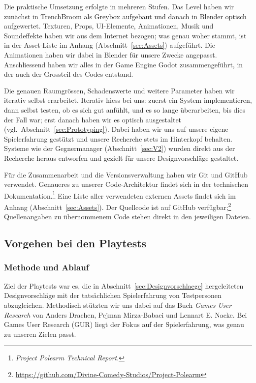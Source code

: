 \documentclass[../Main.tex]{subfiles}
\begin{document}
Die praktische Umsetzung erfolgte in mehreren Stufen. Das Level haben wir zunächst in TrenchBroom als Greybox aufgebaut und danach in Blender optisch aufgewertet. Texturen, Props, UI-Elemente, Animationen, Musik und Soundeffekte haben wir aus dem Internet bezogen; was genau woher stammt, ist in der Asset-Liste im Anhang (Abschnitt~\ref{sec:Assets}) aufgeführt. Die Animationen haben wir dabei in Blender für unsere Zwecke angepasst. Anschliessend haben wir alles in der Game Engine Godot zusammengeführt, in der auch der Grossteil des Codes entstand.

Die genauen Raumgrössen, Schadenswerte und weitere Parameter haben wir iterativ selbst erarbeitet. Iterativ hiess bei uns: zuerst ein System implementieren, dann selbst testen, ob es sich gut anfühlt, und es so lange überarbeiten, bis dies der Fall war; erst danach haben wir es optisch ausgestaltet (vgl.\ Abschnitt~\ref{sec:Prototyping}). Dabei haben wir uns auf unsere eigene Spielerfahrung gestützt und unsere Recherche stets im Hinterkopf behalten. Systeme wie der Gegnermanager (Abschnitt~\ref{sec:V2}) wurden direkt aus der Recherche heraus entworfen und gezielt für unsere Designvorschläge gestaltet.

Für die Zusammenarbeit und die Versionsverwaltung haben wir Git und GitHub verwendet. Genaueres zu unserer Code-Architektur findet sich in der technischen Dokumentation.\footnote{\textit{Project Polearm Technical Report}.} Eine Liste aller verwendeten externen Assets findet sich im Anhang (Abschnitt~\ref{sec:Assets}). Der Quellcode ist auf GitHub verfügbar;\footnote{\url{https://github.com/Divine-Comedy-Studios/Project-Polearm}} Quellenangaben zu übernommenem Code stehen direkt in den jeweiligen Dateien.

\subsection{Vorgehen bei den Playtests} \label{sec:VorgehenPlaytest}

\subsubsection{Methode und Ablauf} \label{sec:MethodePlaytest}
Ziel der Playtests war es, die in Abschnitt~\ref{sec:Designvorschlaege} hergeleiteten Designvorschläge mit der tatsächlichen Spielerfahrung von Testpersonen abzugleichen. Methodisch stützten wir uns dabei auf das Buch \textit{Games User Research} von Anders Drachen, Pejman Mirza-Babaei und Lennart E. Nacke.\autocite{drachen2018gamesuserresearch} Bei Games User Research (GUR) liegt der Fokus auf der Spielerfahrung,\autocite[2]{drachen2018gamesuserresearch} was genau zu unseren Zielen passt.
\end{document}
